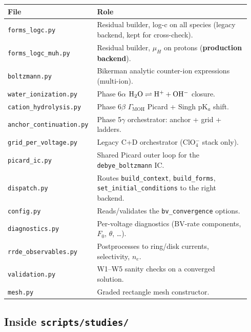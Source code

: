 \documentclass[11pt]{article}
\begin{document}
\begin{center}
\begin{tabular}{p{0.32\linewidth} p{0.62\linewidth}}
\toprule
\textbf{File} & \textbf{Role} \\
\midrule
\texttt{forms\_logc.py}        & Residual builder, log-c on all species (legacy backend, kept for cross-check). \\
\texttt{forms\_logc\_muh.py}   & Residual builder, $\mu_H$ on protons (\textbf{production backend}). \\
\texttt{boltzmann.py}          & Bikerman analytic counter-ion expressions (multi-ion). \\
\texttt{water\_ionization.py}  & Phase 6$\alpha$ $\mathrm{H_2O} \rightleftharpoons \mathrm{H^+} + \mathrm{OH^-}$ closure. \\
\texttt{cation\_hydrolysis.py} & Phase 6$\beta$ $\Gamma_{\mathrm{MOH}}$ Picard + Singh pK$_a$ shift. \\
\texttt{anchor\_continuation.py} & Phase 5$\gamma$ orchestrator: anchor + grid + ladders. \\
\texttt{grid\_per\_voltage.py} & Legacy C+D orchestrator (ClO$_4^-$ stack only). \\
\texttt{picard\_ic.py}         & Shared Picard outer loop for the \texttt{debye\_boltzmann} IC. \\
\texttt{dispatch.py}           & Routes \texttt{build\_context}, \texttt{build\_forms},
                                  \texttt{set\_initial\_conditions} to the right backend. \\
\texttt{config.py}             & Reads/validates the \texttt{bv\_convergence} options. \\
\texttt{diagnostics.py}        & Per-voltage diagnostics (BV-rate components, $F_0$, $\theta$, \dots). \\
\texttt{rrde\_observables.py}  & Postprocesses to ring/disk currents, selectivity, $n_e$. \\
\texttt{validation.py}         & W1--W5 sanity checks on a converged solution. \\
\texttt{mesh.py}               & Graded rectangle mesh constructor. \\
\bottomrule
\end{tabular}
\end{center}

\subsection{Inside \texttt{scripts/studies/}}
\end{document}
